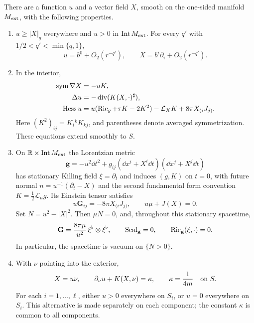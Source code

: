 \begin{proposition}
\label{n3:variation:adjoint}
There are a function $u$ and a vector field $X$, smooth on the
one-sided manifold $M_{\mathrm{ext}}$, with the following properties.
\begin{enumerate}
 \item $u\ge |X|_g$ everywhere and $u>0$ in $\operatorname{Int}M_{\mathrm{ext}}$.
 For every $q'$ with $1/2<q'<\min\{q,1\}$,
 \begin{equation}
  u=b^0+O_2(r^{-q'}),\qquad
  X=b^i\partial_i+O_2(r^{-q'}).
  \label{n3:variation:asymptote}
 \end{equation}
 \item In the interior,
 \begin{align}
  \operatorname{sym}\nabla X&=-uK,\label{n3:variation:kid-first}\\
  \Delta u&=-\operatorname{div}(K(X,\cdot)^\sharp),
    \label{n3:variation:lapse-divergence}\\
  \operatorname{Hess} u
   &=u(\operatorname{Ric}_g+\tau K-2K^2)-\mathcal L_XK
       +8\pi X_{(i}J_{j)}.
    \label{n3:variation:kid-second}
 \end{align}
 Here $(K^2)_{ij}=K_i{}^kK_{kj}$, and parentheses denote averaged
 symmetrization.  These equations extend smoothly to $S$.
 \item On $\mathbb R\times\operatorname{Int}M_{\mathrm{ext}}$ the Lorentzian metric
 \begin{equation}
  \mathbf g=-u^2\dd t^2
       +g_{ij}(\dd x^i+X^i\dd t)(\dd x^j+X^j\dd t)
  \label{n3:variation:stationary-metric}
 \end{equation}
 has stationary Killing field $\xi=\partial_t$ and induces $(g,K)$
 on $t=0$, with future normal $n=u^{-1}(\partial_t-X)$ and the
 second fundamental form convention $K=\frac12\mathcal L_n g$.
 Its Einstein tensor satisfies
 \begin{equation}
  u\mathbf G_{ij}=-8\pi X_{(i}J_{j)},\qquad
  u\mu+J(X)=0.
  \label{n3:variation:einstein-spatial}
 \end{equation}
 Set $N=u^2-|X|^2$.  Then $\mu N=0$, and, throughout this stationary
 spacetime,
 \begin{equation}
  \mathbf G=
    \frac{8\pi\mu}{u^2}\,\xi^\flat\otimes\xi^\flat,
  \qquad \operatorname{Scal}_{\mathbf g}=0,
  \qquad \operatorname{Ric}_{\mathbf g}(\xi,\cdot)=0.
  \label{n3:variation:null-dust}
 \end{equation}
 In particular, the spacetime is vacuum on $\{N>0\}$.
 \item With $\nu$ pointing into the exterior,
 \begin{equation}
  X=u\nu,\qquad
  \partial_\nu u+K(X,\nu)=\kappa,\qquad
  \kappa=\frac1{4m}
  \quad\hbox{on }S.
  \label{n3:variation:boundary-data}
 \end{equation}
 For each $i=1,\ldots,\ell$, either $u>0$ everywhere on $S_i$,
 or $u=0$ everywhere on $S_i$.  This alternative is made separately
 on each component; the constant $\kappa$ is common to all components.
\end{enumerate}
\end{proposition}

